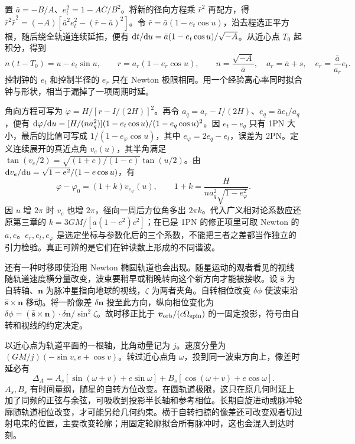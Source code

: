 置 $\bar a=-B/A$、$e_t^2=1-A\bar C/B^2$。将新的径向方程乘 $\bar r^2$ 再配方，得 $\bar r^2\dot{\bar r}^2=(-A)[\bar a^2 e_t^2-(\bar r-\bar a)^2]$。令 $\bar r=\bar a(1-e_t\cos u)$，沿去程选正平方根，随后绕全轨道连续延拓，便有 $\dd t/\dd u=\bar a(1-e_t\cos u)/\sqrt{-A}$。从近心点 $T_0$ 起积分，得到
\[
 n(t-T_0)=u-e_t\sin u,\qquad
 r=a_r(1-e_r\cos u),\qquad
 n=\frac{\sqrt{-A}}{\bar a},\quad a_r=\bar a+s,\quad e_r=\frac{\bar a}{a_r}e_t .
\]
控制钟的 $e_t$ 和控制半径的 $e_r$ 只在 Newton 极限相同。用一个经验离心率同时拟合钟与形状，相当于漏掉了一项周期时延。

角向方程可写为 $\dot\varphi=H/[r-I/(2H)]^2$。再令 $a_q=a_r-I/(2H)$、$e_q=\bar a e_t/a_q$，便有 $\dd\varphi/\dd u=[H/(na_q^2)](1-e_t\cos u)/(1-e_q\cos u)^2$。因 $e_t-e_q$ 只有 1PN 大小，最后的比值可写成 $1/(1-e_\varphi\cos u)$，其中 $e_\varphi=2e_q-e_t$，误差为 2PN。定义连续展开的真近点角 $v_e(u)$，其半角满足 $\tan(v_e/2)=\sqrt{(1+e)/(1-e)}\tan(u/2)$。由 $\dd v_e/\dd u=\sqrt{1-e^2}/(1-e\cos u)$，有
\[
 \varphi-\varphi_0=(1+k)v_{e_\varphi}(u),\qquad
 1+k=\frac{H}{n a_q^2\sqrt{1-e_\varphi^2}} .
\]
因 $u$ 增 $2\pi$ 时 $v_e$ 也增 $2\pi$，径向一周后方位角多出 $2\pi k$。代入广义相对论系数应还原第三章的 $k=3GM/[a(1-e^2)c^2]$；在已是 1PN 的修正项里可取 Newton 的 $a,e$。$e_r,e_t,e_\varphi$ 是选定坐标与参数化后的三个系数，不能把三者之差都当作独立的引力检验。真正可辨的是它们在钟读数上形成的不同谐波。

还有一种时移即使沿用 Newton 椭圆轨道也会出现。随星运动的观者看见的视线随轨道速度横分量改变，波束要稍早或稍晚转向这个新方向才能被接收。设 $\hat{\bm s}$ 为自转轴、$\bm n$ 为脉冲星指向地球的视线，$\zeta$ 为两者夹角。自转相位改变 $\delta\phi$ 使波束沿 $\hat{\bm s}\times\bm n$ 移动。将一阶像差 $\delta\bm n$ 投至此方向，纵向相位变化为 $\delta\phi=(\hat{\bm s}\times\bm n)\cdot\delta\bm n/\sin^2\zeta$。故时移正比于 $\bm v_{\rm orb}/(c\Omega_{\rm spin})$ 的一固定投影，符号由自转和视线的约定决定。

以近心点为轨道平面的一根轴，比角动量记为 $j$。速度分量为 $(GM/j)(-\sin v,e+\cos v)$。转过近心点角 $\omega$，投到同一波束方向上，像差时延必有
\[
 \Delta_A=A_s[\sin(\omega+v)+e\sin\omega]
          +B_s[\cos(\omega+v)+e\cos\omega] .
\]
$A_s,B_s$ 有时间量纲，随星的自转方位改变。在圆轨道极限，这只在原几何时延上加了同频的正弦与余弦，可吸收到投影半长轴和参考相位。长期自旋进动或脉冲轮廓随轨道相位改变，才可能另给几何约束。横于自转扫掠的像差还可改变观者切过射电束的位置，主要改变轮廓；用固定轮廓拟合所有脉冲时，这也会混入到达时刻。

